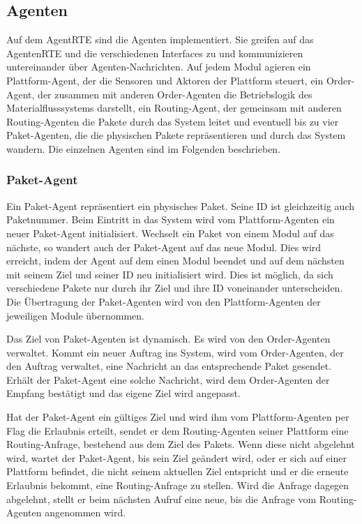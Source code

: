 \subsection{Agenten}
Auf dem AgentRTE sind die Agenten implementiert. Sie greifen auf das AgentenRTE und die verschiedenen Interfaces zu und kommunizieren untereinander über Agenten-Nachrichten. Auf jedem Modul agieren ein Plattform-Agent, der die Sensoren und Aktoren der Plattform steuert, ein Order-Agent, der zusammen mit anderen Order-Agenten die Betriebslogik des Materialflusssystems darstellt, ein Routing-Agent, der gemeinsam mit anderen Routing-Agenten die Pakete durch das System leitet und eventuell bis zu vier Paket-Agenten, die die physischen Pakete repräsentieren und durch das System wandern. Die einzelnen Agenten sind im Folgenden beschrieben.
\subsubsection{Paket-Agent}
Ein Paket-Agent repräsentiert ein physisches Paket. Seine ID ist gleichzeitig auch Paketnummer. Beim Eintritt in das System wird vom Plattform-Agenten ein neuer Paket-Agent initialisiert. Wechselt ein Paket von einem Modul auf das nächste, so wandert auch der Paket-Agent auf das neue Modul. Dies wird erreicht, indem der Agent auf dem einen Modul beendet und auf dem nächsten mit seinem Ziel und seiner ID neu initialisiert wird. Dies ist möglich, da sich verschiedene Pakete nur durch ihr Ziel und ihre ID voneinander unterscheiden. Die Übertragung der Paket-Agenten wird von den Plattform-Agenten der jeweiligen Module übernommen.

Das Ziel von Paket-Agenten ist dynamisch. Es wird von den Order-Agenten verwaltet. Kommt ein neuer Auftrag ins System, wird vom Order-Agenten, der den Auftrag verwaltet, eine Nachricht an das entsprechende Paket gesendet. Erhält der Paket-Agent eine solche Nachricht, wird dem Order-Agenten der Empfang bestätigt und das eigene Ziel wird angepasst.

Hat der Paket-Agent ein gültiges Ziel und wird ihm vom Plattform-Agenten per Flag die Erlaubnis erteilt, sendet er dem Routing-Agenten seiner Plattform eine Routing-Anfrage, bestehend aus dem Ziel des Pakets. Wenn diese nicht abgelehnt wird, wartet der Paket-Agent, bis sein Ziel geändert wird, oder er sich auf einer Plattform befindet, die nicht seinem aktuellen Ziel entspricht und er die erneute Erlaubnis bekommt, eine Routing-Anfrage zu stellen. Wird die Anfrage dagegen abgelehnt, stellt er beim nächsten Aufruf eine neue, bis die Anfrage vom Routing-Agenten angenommen wird.

